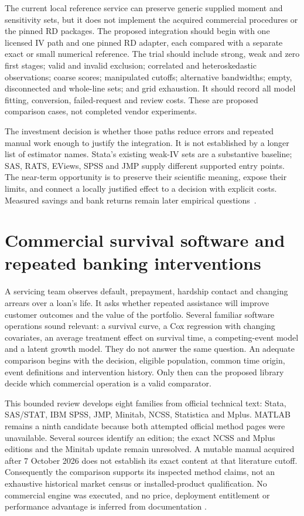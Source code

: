 The current local reference service can preserve generic supplied
moment and sensitivity sets, but it does not implement the acquired
commercial procedures or the pinned RD packages. The proposed
integration should begin with one licensed IV path and one pinned
RD adapter, each compared with a separate exact or small numerical
reference. The trial should include strong, weak and zero first stages;
valid and invalid exclusion; correlated and heteroskedastic observations;
coarse scores; manipulated cutoffs; alternative bandwidths; empty,
disconnected and whole-line sets; and grid exhaustion. It should
record all model fitting, conversion, failed-request and review costs.
These are proposed comparison cases, not completed vendor experiments.

The investment decision is whether those paths reduce errors and
repeated manual work enough to justify the integration. It is not
established by a longer list of estimator names. Stata's existing
weak-IV sets are a substantive baseline; SAS, RATS, EViews, SPSS
and JMP supply different supported entry points. The near-term
opportunity is to preserve their scientific meaning, expose their
limits, and connect a locally justified effect to a decision with
explicit costs. Measured savings and bank returns remain later
empirical questions~\citep{exec13_ivrd_survey,exec13_ivrd_exact}.
\label{exec13:commercial-iv-rd-end}


\section{Commercial survival software and repeated banking interventions}
\label{exec15:commercial-survival}

A servicing team observes default, prepayment, hardship contact and changing
arrears over a loan's life. It asks whether repeated assistance will improve
customer outcomes and the value of the portfolio. Several familiar software
operations sound relevant: a survival curve, a Cox regression with changing
covariates, an average treatment effect on survival time, a competing-event
model and a latent growth model. They do not answer the same question.
An adequate comparison begins with the decision, eligible population, common
time origin, event definitions and intervention history. Only then can the
proposed library decide which commercial operation is a valid comparator.

This bounded review develops eight families from official technical text:
Stata, SAS/STAT, IBM SPSS, JMP, Minitab, NCSS, Statistica and Mplus. MATLAB
remains a ninth candidate because both attempted official method pages were
unavailable. Several sources identify an edition; the exact NCSS and Mplus
editions and the Minitab update remain unresolved. A mutable manual acquired
after 7 October 2026 does not establish its exact content at that literature
cutoff. Consequently the comparison supports its inspected method claims,
not an exhaustive historical market census or installed-product qualification.
No commercial engine was executed, and no price, deployment entitlement or
performance advantage is inferred from documentation
\citep{exec14_survival_survey}.

